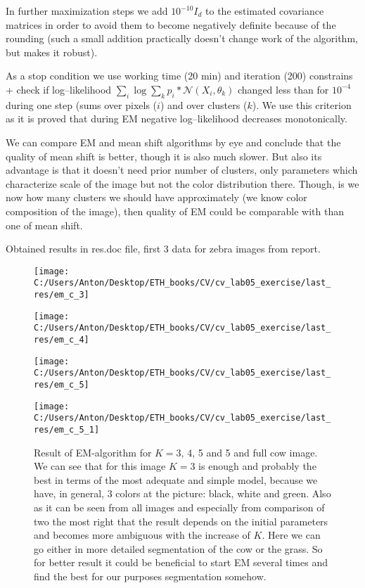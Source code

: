 \documentclass{report}
\begin{document}
In further maximization steps we add $10^{-10}I_d$ to the estimated covariance matrices in order to avoid them to become negatively definite because of the rounding (such a small addition practically doesn't change work of the algorithm, but makes it robust).

As a stop condition we use working time (20 min) and iteration (200) constrains + check if log--likelihood $\sum_i \log \sum_k p_i*\mathcal{N}(X_i, \theta_k)$ changed less than for $10^{-4}$ during one step (sums over pixels ($i$) and over clusters ($k$). We use this criterion as it is proved that during EM negative log--likelihood decreases monotonically.

We can compare EM and mean shift algorithms by eye and conclude that the quality of mean shift is better, though it is also much slower. But also its advantage is that it doesn't need prior number of clusters, only parameters which characterize scale of the image but not the color distribution there. Though, is we now how many clusters we should have approximately (we know color composition of the image), then quality of EM could be comparable with than one of mean shift.

Obtained results in res.doc file, first 3 data for zebra images from report.
\begin{figure}[h!]
	\begin{center}
		\begin{minipage}[h]{0.23\linewidth}
			\texttt{[image: C:/Users/Anton/Desktop/ETH\_books/CV/cv\_lab05\_exercise/last\_res/em\_c\_3]}
		\end{minipage}
		\hfill
		\begin{minipage}[h]{0.23\linewidth}
			\texttt{[image: C:/Users/Anton/Desktop/ETH\_books/CV/cv\_lab05\_exercise/last\_res/em\_c\_4]}
		\end{minipage}
	\hfill
	\begin{minipage}[h]{0.23\linewidth}
		\texttt{[image: C:/Users/Anton/Desktop/ETH\_books/CV/cv\_lab05\_exercise/last\_res/em\_c\_5]}
	\end{minipage}
\hfill
\begin{minipage}[h]{0.23\linewidth}
	\texttt{[image: C:/Users/Anton/Desktop/ETH\_books/CV/cv\_lab05\_exercise/last\_res/em\_c\_5\_1]}
\end{minipage}
\caption{Result of EM-algorithm for $K=$3, 4, 5 and 5 and full cow image. We can see that for this image $K=3$ is enough and probably the best in terms of the most adequate and simple model, because we have, in general, 3 colors at the picture: black, white and green. Also as it can be seen from all images and especially from comparison of two the most right that the result depends on the initial parameters and becomes more ambiguous with the increase of $K$. Here we can go either in more detailed segmentation of the cow or the grass. So for better result it could be beneficial to start EM several times and find the best for our purposes segmentation somehow. }
	\end{center}
\end{figure}
\end{document}

